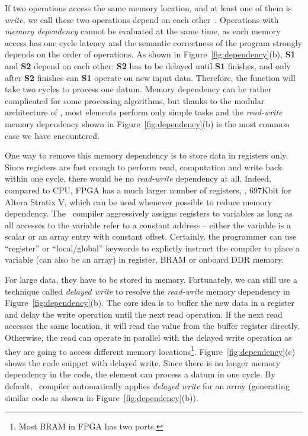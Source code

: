 If two operations access the same memory location, and at least one of them
is \textit{write}, we call these two operations depend on each other~\cite{dependence}. 
Operations with \textit{memory dependency} cannot be evaluated at the same time,
as each memory access has one cycle latency and the semantic correctness of the program strongly depends on the order
of operations.
%
As shown in Figure~\ref{fig:dependency}(b), \textbf{S1} and \textbf{S2}
depend on each other: \textbf{S2} has to be delayed until \textbf{S1} finishes, 
and only after \textbf{S2} finishes can \textbf{S1} operate on new input data.
Therefore, the function will take two cycles to process one datum.
%
Memory dependency can be rather complicated for some processing algorithms,
but thanks to the modular architecture of \name, most elements perform 
only simple tasks and the \textit{read-write} memory dependency shown in 
Figure~\ref{fig:dependency}(b) is the most common case we have encountered.

One way to remove this memory dependency is to store data in registers only. 
%
Since registers are fast enough to perform read, computation and write back within one cycle,
there would be no \textit{read-write} dependency at all. 
Indeed, compared to CPU, FPGA has a much larger number of 
registers, \ie, 697Kbit for Altera Stratix V, which can be used
whenever possible to reduce memory dependency.
The \name\ compiler aggressively assigns registers to variables as long as
all accesses to the variable refer to a constant address -- either the variable is a scalar or an array entry with constant offset.
%
Certainly, the programmer can use ``register'' or ``local/global'' keywords to explictly instruct the compiler to place a variable (can also be an array)
in register, BRAM or onboard DDR memory.

For large data, they have to be stored in memory. 
%
Fortunately, we can still use a technique called \textit{delayed write} to
resolve the \textit{read-write} memory dependency in Figure~\ref{fig:dependency}(b).
The core idea is to buffer the new data in a register and delay the write
operation until the next read operation. 
If the next read accesses the same location, it will read the value from
the buffer register directly. Otherwise, the read can operate in parallel 
with the delayed write operation as they are going to access different
memory locations\footnote{Most BRAM in FPGA has two ports.}.
Figure~\ref{fig:dependency}(c) shows the code snippet with delayed write.
Since there is no longer memory dependency in the code, the element can 
process a datum in one cycle.
%
By default, \name\ compiler automatically applies \textit{delayed write} 
for an array (generating similar code as shown in Figure~\ref{fig:dependency}(b)).
%


